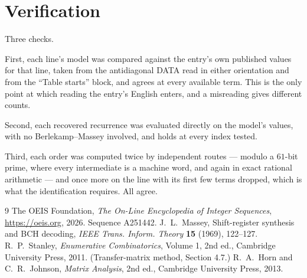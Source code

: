 \documentclass[11pt,a4paper]{article}
\theoremstyle{plain}
\theoremstyle{definition}
\begin{document}
\section{Verification}

Three checks.

First, each line's model was compared against the entry's own published values for that line,
taken from the antidiagonal DATA read in either orientation and from the ``Table starts''
block, and agrees at every available term. This is the only point at which reading the entry's
English enters, and a misreading gives different counts.

Second, each recovered recurrence was evaluated directly on the model's values, with no
Berlekamp--Massey involved, and holds at every index tested.

Third, each order was computed twice by independent routes --- modulo a $61$-bit prime, where
every intermediate is a machine word, and again in exact rational arithmetic --- and once more
on the line with its first few terms dropped, which is what the identification requires. All
agree.

\begin{thebibliography}{9}
 The OEIS Foundation, \emph{The On-Line Encyclopedia of Integer
Sequences}, \url{https://oeis.org}, 2026. Sequence A251442.
 J.~L.~Massey, Shift-register synthesis and BCH decoding, \emph{IEEE
Trans. Inform. Theory} \textbf{15} (1969), 122--127.
 R.~P.~Stanley, \emph{Enumerative Combinatorics}, Volume 1, 2nd ed.,
Cambridge University Press, 2011. (Transfer-matrix method, Section 4.7.)
 R.~A.~Horn and C.~R.~Johnson, \emph{Matrix Analysis}, 2nd ed., Cambridge
University Press, 2013.
\end{thebibliography}
\end{document}
